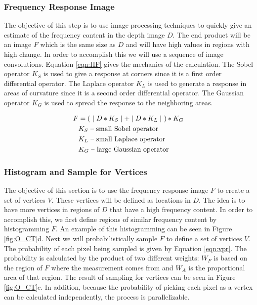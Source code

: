 \documentclass[12pt]{article}
\begin{document}
\subsubsection{Frequency Response Image}

The objective of this step is to use image processing techniques to
quickly give an estimate of the frequency content in the depth image
$D$. The end product will be an image $F$ which is the same size as $D$
and will have high values in regions with high change. In order to accomplish
this we will use a sequence of image convolutions. Equation \ref{eqn:HF}
gives the mechanics of the calculation. The Sobel operator $K_S$ is
used to give a response at corners since it is a first order
differential operator. The Laplace operator $K_L$ is used to generate a
response in areas of curvature since it is a second order differential
operator. The Gaussian operator $K_G$ is used to spread the response to the
neighboring areas.   

\begin{align}
F&=(\ \mid D \ast K_S \mid + \mid D \ast K_L \mid \ ) \ast K_G \label{eqn:HF} \\
 & K_S\text{ -- small Sobel operator}  \notag  \\
 & K_L\text{ -- small Laplace operator} \notag \\ 
 & K_G\text{ -- large Gaussian operator} \notag
\end{align}

\subsubsection{Histogram and Sample for Vertices}

The objective of this section is to use the frequency response image $F$ to
create a set of vertices $V$. These vertices will be defined as locations
in $D$. The idea is to have more vertices in regions of $D$
that have a high frequency content. In order to accomplish this, we first
define regions of similar frequency content by histogramming $F$. An
example of this histogramming can be seen in Figure \ref{fig:O_CT}d.  Next
we will probabilistically sample $F$ to define a set of vertices $V$. The
probability of each pixel being sampled is given by Equation \ref{eqn:vpr}.
The probability is calculated by the product of two different weights:
$W_F$ is based on the region of $F$ where the measurement comes from and
$W_A$ is the proportional area of that region. The result of sampling for
vertices can be seen in Figure \ref{fig:O_CT}e. In addition, because the
probability of picking each pixel as a vertex can be calculated
independently, the process is parallelizable.   
\end{document}

